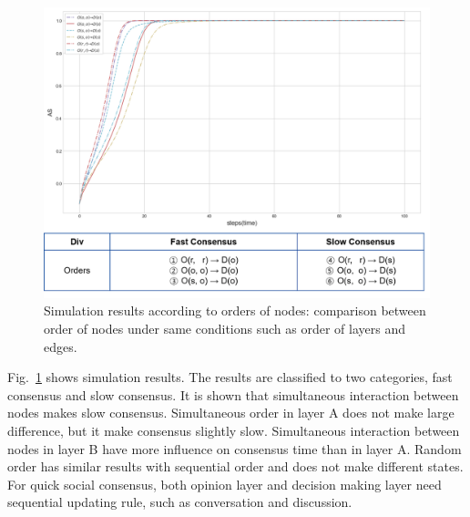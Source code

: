 \begin{figure}[!htb]
	\centering
	\includegraphics[width=\hsize]{figure/chap4_nodeorder.png}
	\caption{Simulation results according to orders of nodes: comparison between order of nodes under same conditions such as order of layers and edges.}
	\label{chap4_nodeorder}
\end{figure}
Fig.~\ref{chap4_nodeorder} shows simulation results. The results are classified to two categories, fast consensus and slow consensus. It is shown that simultaneous interaction between nodes makes slow consensus. Simultaneous order in layer A does not make large difference, but it make consensus slightly slow. Simultaneous interaction between nodes in layer B have more influence on consensus time than in layer A. Random order has similar results with sequential order and does not make different states. For quick social consensus, both opinion layer and decision making layer need sequential updating rule, such as conversation and discussion.      

